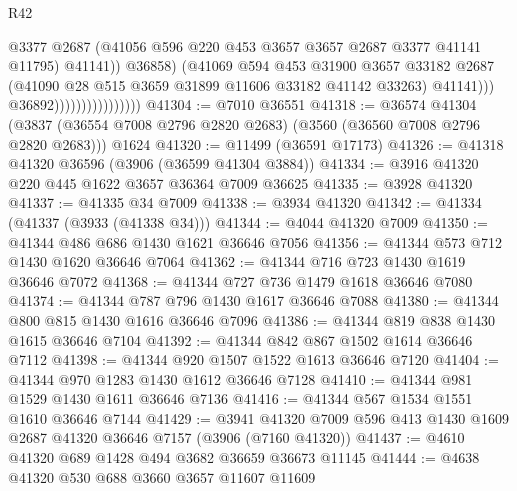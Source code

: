 \begin{lexlean}{R42}
\begin{coremodule}
                                              @3377
                                              @2687
                                              (@41056
                                                @596
                                                @220
                                                @453
                                                @3657
                                                @3657
                                                @2687
                                                @3377
                                                @41141
                                                @11795)
                                              @41141))
                                          @36858)
                                        (@41069
                                          @594
                                          @453
                                          @31900
                                          @3657
                                          @33182
                                          @2687
                                          (@41090 @28 @515 @3659 @31899 @11606 @33182 @41142 @33263)
                                          @41141)))
                                    @36892))))))))))))))))
@41304 := @7010 @36551
@41318 := @36574
    @41304
    (@3837 (@36554 @7008 @2796 @2820 @2683) (@3560 (@36560 @7008 @2796 @2820 @2683)))
    @1624
@41320 := @11499 (@36591 @17173)
@41326 := @41318 @41320 @36596 (@3906 (@36599 @41304 @3884))
@41334 := @3916 @41320 @220 @445 @1622 @3657 @36364 @7009 @36625
@41335 := @3928 @41320
@41337 := @41335 @34 @7009
@41338 := @3934 @41320
@41342 := @41334 (@41337 (@3933 (@41338 @34)))
@41344 := @4044 @41320 @7009
@41350 := @41344 @486 @686 @1430 @1621 @36646 @7056
@41356 := @41344 @573 @712 @1430 @1620 @36646 @7064
@41362 := @41344 @716 @723 @1430 @1619 @36646 @7072
@41368 := @41344 @727 @736 @1479 @1618 @36646 @7080
@41374 := @41344 @787 @796 @1430 @1617 @36646 @7088
@41380 := @41344 @800 @815 @1430 @1616 @36646 @7096
@41386 := @41344 @819 @838 @1430 @1615 @36646 @7104
@41392 := @41344 @842 @867 @1502 @1614 @36646 @7112
@41398 := @41344 @920 @1507 @1522 @1613 @36646 @7120
@41404 := @41344 @970 @1283 @1430 @1612 @36646 @7128
@41410 := @41344 @981 @1529 @1430 @1611 @36646 @7136
@41416 := @41344 @567 @1534 @1551 @1610 @36646 @7144
@41429 := @3941 @41320 @7009 @596 @413 @1430 @1609 @2687 @41320 @36646 @7157 (@3906 (@7160 @41320))
@41437 := @4610 @41320 @689 @1428 @494 @3682 @36659 @36673 @11145
@41444 := @4638 @41320 @530 @688 @3660 @3657 @11607 @11609

\end{coremodule}
\end{lexlean}
